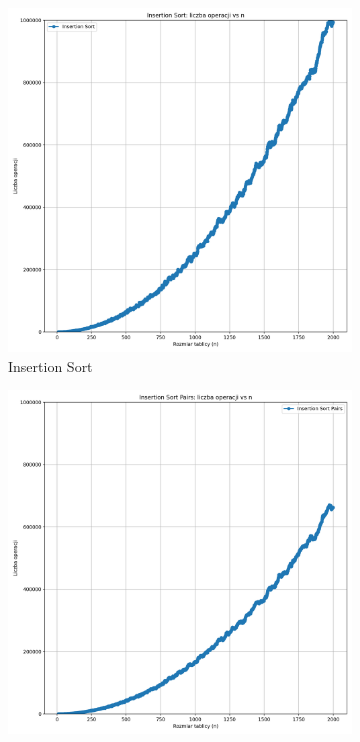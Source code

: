 \documentclass[11pt,a4paper]{article}
\begin{document}
\begin{figure}[h]
  \centering
  \begin{subfigure}{.32\textwidth}
    \centering\includegraphics[width=\linewidth]{insertion_sort.png}
    \caption{Insertion Sort}
  \end{subfigure}
  \begin{subfigure}{.32\textwidth}
    \centering\includegraphics[width=\linewidth]{insertion_sort_pairs.png}

\end{subfigure}
\end{figure}
\end{document}
